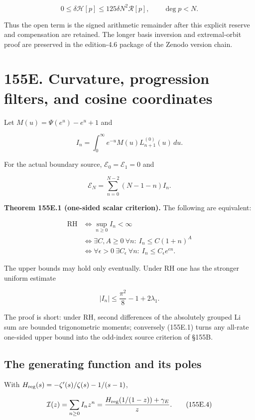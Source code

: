 \documentclass[
  11pt,
]{book}
\begin{document}
\[
0\le\delta\mathcal H[p]\le125\delta N^2\mathcal R[p],
\qquad\deg p<N.
\tag{155D.13}
\]

Thus the open term is the signed arithmetic remainder after this
explicit reserve and compensation are retained. The longer basis
inversion and extremal-orbit proof are preserved in the edition-4.6
package of the Zenodo version chain.

\section{155E. Curvature, progression filters, and cosine
coordinates}\label{e.-curvature-progression-filters-and-cosine-coordinates}

Let \(M(u)=\Psi(e^u)-e^u+1\) and

\[
I_n=\int_0^\infty e^{-u}M(u)L_{n+1}^{(0)}(u)\,du.
\]

For the actual boundary source, \(\mathcal E_0=\mathcal E_1=0\) and

\[
\mathcal E_N=\sum_{n=0}^{N-2}(N-1-n)I_n.
\tag{155E.1}
\]

\textbf{Theorem 155E.1 (one-sided scalar criterion).} The following are
equivalent:

\[
\boxed{\begin{aligned}
\mathrm{RH}&\iff\sup_{n\ge0}I_n<\infty\\
&\iff\exists C,A\ge0\ \forall n:\ I_n\le C(1+n)^A\\
&\iff\forall\epsilon>0\ \exists C_\epsilon\ \forall n:\
I_n\le C_\epsilon e^{\epsilon n}.
\end{aligned}}
\tag{155E.2}
\]

The upper bounds may hold only eventually. Under RH one has the stronger
uniform estimate

\[
|I_n|\le\frac{\pi^2}{8}-1+2\lambda_1.
\tag{155E.3}
\]

The proof is short: under RH, second differences of the absolutely
grouped Li sum are bounded trigonometric moments; conversely (155E.1)
turns any all-rate one-sided upper bound into the odd-index source
criterion of §155B.

\subsection{The generating function and its
poles}\label{the-generating-function-and-its-poles}

With \(H_{\rm reg}(s)=-\zeta'(s)/\zeta(s)-1/(s-1)\),

\[
\mathcal I(z)=\sum_{n\ge0}I_nz^n
=\frac{H_{\rm reg}(1/(1-z))+\gamma_E}{z}.
\tag{155E.4}
\]
\end{document}
